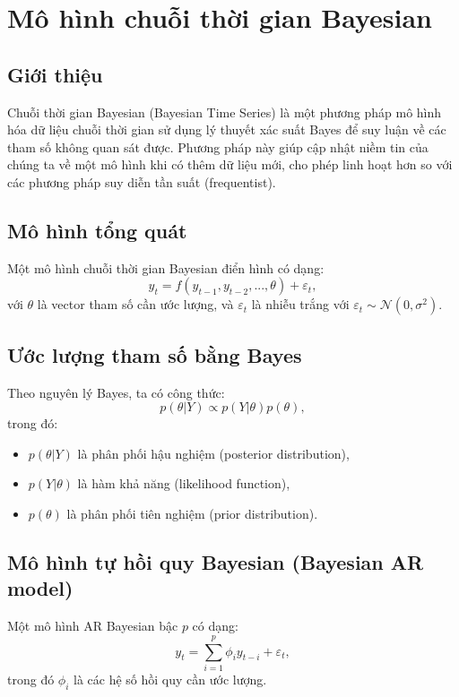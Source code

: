 \chapter{Mô hình chuỗi thời gian Bayesian}

\section{Giới thiệu}
Chuỗi thời gian Bayesian (Bayesian Time Series) là một phương pháp mô hình hóa dữ liệu chuỗi thời gian sử dụng lý thuyết xác suất Bayes để suy luận về các tham số không quan sát được. Phương pháp này giúp cập nhật niềm tin của chúng ta về một mô hình khi có thêm dữ liệu mới, cho phép linh hoạt hơn so với các phương pháp suy diễn tần suất (frequentist).

\section{Mô hình tổng quát}
Một mô hình chuỗi thời gian Bayesian điển hình có dạng:
\begin{equation}
    y_t = f(y_{t-1}, y_{t-2}, ..., \theta) + \varepsilon_t,
\end{equation}
với \(\theta\) là vector tham số cần ước lượng, và \(\varepsilon_t\) là nhiễu trắng với \(\varepsilon_t \sim \mathcal{N}(0, \sigma^2)\).

\section{Ước lượng tham số bằng Bayes}
Theo nguyên lý Bayes, ta có công thức:
\begin{equation}
    p(\theta | Y) \propto p(Y | \theta) p(\theta),
\end{equation}
trong đó:
\begin{itemize}
    \item \(p(\theta | Y)\) là phân phối hậu nghiệm (posterior distribution),
    \item \(p(Y | \theta)\) là hàm khả năng (likelihood function),
    \item \(p(\theta)\) là phân phối tiên nghiệm (prior distribution).
\end{itemize}

\section{Mô hình tự hồi quy Bayesian (Bayesian AR model)}
Một mô hình AR Bayesian bậc \(p\) có dạng:
\begin{equation}
    y_t = \sum_{i=1}^{p} \phi_i y_{t-i} + \varepsilon_t,
\end{equation}
trong đó \(\phi_i\) là các hệ số hồi quy cần ước lượng.


